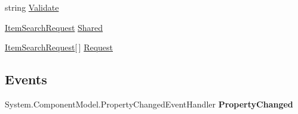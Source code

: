 \begin{DoxyCompactItemize}
\begin{DoxyCompactList}\small\item\em \end{DoxyCompactList}\item 
\hypertarget{class_amazon___price___finder_1_1amazon_1_1ecs_1_1_item_search_a4eb830605293e1ee362abe0ad2e7deca}{string \hyperlink{class_amazon___price___finder_1_1amazon_1_1ecs_1_1_item_search_a4eb830605293e1ee362abe0ad2e7deca}{Validate}}\label{class_amazon___price___finder_1_1amazon_1_1ecs_1_1_item_search_a4eb830605293e1ee362abe0ad2e7deca}

\begin{DoxyCompactList}\small\item\em \end{DoxyCompactList}\item 
\hypertarget{class_amazon___price___finder_1_1amazon_1_1ecs_1_1_item_search_a894ece1b86c899b91aeb80977b66575a}{\hyperlink{class_amazon___price___finder_1_1amazon_1_1ecs_1_1_item_search_request}{Item\-Search\-Request} \hyperlink{class_amazon___price___finder_1_1amazon_1_1ecs_1_1_item_search_a894ece1b86c899b91aeb80977b66575a}{Shared}}\label{class_amazon___price___finder_1_1amazon_1_1ecs_1_1_item_search_a894ece1b86c899b91aeb80977b66575a}

\begin{DoxyCompactList}\small\item\em \end{DoxyCompactList}\item 
\hypertarget{class_amazon___price___finder_1_1amazon_1_1ecs_1_1_item_search_ab7cb4808616e2130838750eb7c7d0d0e}{\hyperlink{class_amazon___price___finder_1_1amazon_1_1ecs_1_1_item_search_request}{Item\-Search\-Request}\mbox{[}$\,$\mbox{]} \hyperlink{class_amazon___price___finder_1_1amazon_1_1ecs_1_1_item_search_ab7cb4808616e2130838750eb7c7d0d0e}{Request}}\label{class_amazon___price___finder_1_1amazon_1_1ecs_1_1_item_search_ab7cb4808616e2130838750eb7c7d0d0e}

\begin{DoxyCompactList}\small\item\em \end{DoxyCompactList}\end{DoxyCompactItemize}
\subsection*{Events}
\begin{DoxyCompactItemize}
\item 
\hypertarget{class_amazon___price___finder_1_1amazon_1_1ecs_1_1_item_search_a0828b04a6d38ce6076ee278241a08aa4}{System.\-Component\-Model.\-Property\-Changed\-Event\-Handler {\bfseries Property\-Changed}}\label{class_amazon___price___finder_1_1amazon_1_1ecs_1_1_item_search_a0828b04a6d38ce6076ee278241a08aa4}

\end{DoxyCompactItemize}


